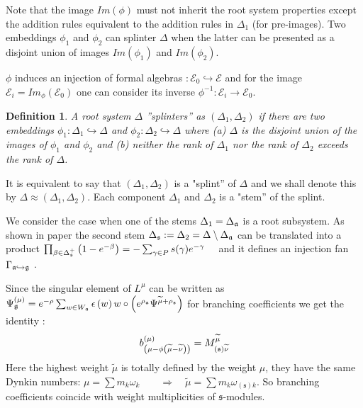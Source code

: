 \documentclass[12pt]{article}
\newtheorem{Def}{Definition}[section]
\newcommand{\sfr}{\mathfrak{s}}
\begin{document}
Note that the image $Im(\phi)$ must not inherit the root system properties except the addition rules
equivalent to the addition rules in $\Delta_{1}$ (for pre-images). Two embeddings $\phi_1$ and
$\phi_2$ can splinter $\Delta$ when the latter can be presented as a disjoint union of images
$Im(\phi_1)$ and $Im(\phi_2)$.

$\phi$ induces an injection of formal algebras $:{\mathcal{E}}_0
\hookrightarrow \mathcal{E}$ and for the image ${\mathcal{E}}%
_i=Im_{\phi}\left( {\mathcal{E}}_0\right)$ one can consider its inverse $%
\phi^{-1}:{\mathcal{E}}_i \longrightarrow {\mathcal{E}}_0$.

\begin{Def}
  A root system $\Delta $ ''splinters'' as $(\Delta _{1},\Delta _{2})$ if there are two embeddings
  $\phi _{1}:\Delta _{1}\hookrightarrow \Delta $ and $%
  \phi _{2}:\Delta _{2}\hookrightarrow \Delta $ where (a) $\Delta $ is the disjoint union of the
  images of $\phi _{1}$ and $\phi _{2}$ and (b) neither the rank of $\Delta _{1}$ nor the rank of
  $\Delta _{2}$ exceeds the rank of $%
  \Delta $.
\end{Def}

It is equivalent to say that $(\Delta_1,\Delta_2)$ is a "splint'' of $\Delta$ and we shall denote
this by $\Delta \approx (\Delta_1,\Delta_2)$. Each component $\Delta_1$ and $\Delta_2$ is a "stem''
of the splint.

We consider the case when one of the stems $\Delta _{1}=\Delta _{\frak{a}}$ is a root subsystem. As shown in paper \cite{2011arXiv1111.6787L} the second stem $\Delta _{\frak{s}}:=\Delta
_{2}=\Delta \setminus \Delta _{\frak{a}}$ can be translated into a product
$\prod_{\beta \in \Delta _{\frak{s}}^{+}}\left( 1-e^{-\beta }\right)=-\sum_{\gamma \in P}s(\gamma )e^{-\gamma }\quad   \label{splint product}$
and it defines an injection fan $\Gamma _{\frak{a}%
\hookrightarrow \frak{g}}$ \cite{lyakhovsky1996rra,ilyin812pbc,2010arXiv1007.0318L}.

Since the singular element of $L^{\mu}$ can be
written as $\Psi _{\frak{g}}^{\left( \mu \right) }=e^{-\rho }
\sum_{w\in W_{\frak{a}}}\epsilon \left( w \right) w\circ \left(
e^{\rho _{\frak{a}}}\Psi ^{\widetilde{\mu }+\rho
_{\frak{s}}}\right)$  for branching coefficients we get the
identity \cite{2011arXiv1111.6787L}:
\begin{equation}
  \label{eq:9}
b_{\left( \mu -\phi \left( \widetilde{\mu }-\widetilde{\nu }\right) \right)
}^{(\mu )}=M_{\left( \frak{s}\right) \widetilde{\nu }}^{\widetilde{\mu }}  
\end{equation}
Here the highest weight $\widetilde{\mu }$ is totally defined by the weight $\mu $, they have the
same Dynkin numbers: $\mu =\sum m_{k}\omega _{k}\qquad \Longrightarrow \quad \widetilde{\mu }=\sum
m_{k}\omega_{(\sfr) k} . \label{new h weight}$ So branching coefficients coincide with weight
multiplicities of $\sfr$-modules.
\end{document}
